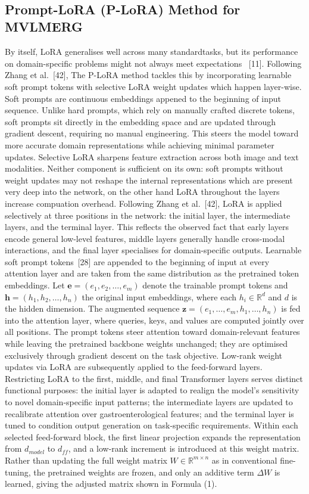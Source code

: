 ﻿﻿\documentclass[12pt]{report}
\begin{document}
\subsection{Prompt-LoRA (P-LoRA) Method for MVLMERG}
By itself, LoRA generalises well across many standardtasks, but its performance on domain-specific problems might not always meet expectations ~[11]. Following Zhang et al.~[42], The P-LoRA method tackles this by incorporating learnable soft prompt tokens with selective LoRA weight updates which happen layer-wise. Soft prompts are continuous embeddings appened to the beginning of input sequence. Unlike hard prompts, which rely on manually crafted discrete tokens, soft prompts sit directly in the embedding space and are updated through gradient descent, requiring no manual engineering. This steers the model toward more accurate domain representations while achieving minimal parameter updates. Selective LoRA sharpens feature extraction across both image and text modalities. Neither component is sufficient on its own: soft prompts without weight updates may not reshape the internal representations which are present very deep into the network, on the other hand LoRA throughout the layers increase compuation overhead. Following Zhang et al.~[42], LoRA is applied selectively at three positions in the network: the initial layer, the intermediate layers, and the terminal layer. This reflects the observed fact that early layers encode general low-level features, middle layers generally handle cross-modal interactions, and the final layer specialises for domain-specific outputs.
Learnable soft prompt tokens~[28] are appended to the beginning of input at every attention layer and are taken from the same distribution as the pretrained token embeddings. Let $\mathbf{e} = (e_1, e_2, \ldots, e_m)$ denote the trainable prompt tokens and $\mathbf{h} = (h_1, h_2, \ldots, h_n)$ the original input embeddings, where each $h_i \in \mathbb{R}^{d}$ and $d$ is the hidden dimension. The augmented sequence $\mathbf{z} = (e_1, \ldots, e_m, h_1, \ldots, h_n)$ is fed into the attention layer, where queries, keys, and values are computed jointly over all positions. The prompt tokens steer attention toward domain-relevant features while leaving the pretrained backbone weights unchanged; they are optimised exclusively through gradient descent on the task objective.
Low-rank weight updates via LoRA are subsequently applied to the feed-forward layers. Restricting LoRA to the first, middle, and final Transformer layers serves distinct functional purposes: the initial layer is adapted to realign the model's sensitivity to novel domain-specific input patterns; the intermediate layers are updated to recalibrate attention over gastroenterological features; and the terminal layer is tuned to condition output generation on task-specific requirements. Within each selected feed-forward block, the first linear projection expands the representation from $d_{model}$ to $d_{ff}$, and a low-rank increment is introduced at this weight matrix. Rather than updating the full weight matrix $W \in \mathbb{R}^{m \times n}$ as in conventional fine-tuning, the pretrained weights are frozen, and only an additive term $\Delta W$ is learned, giving the adjusted matrix shown in Formula (1).
\end{document}
